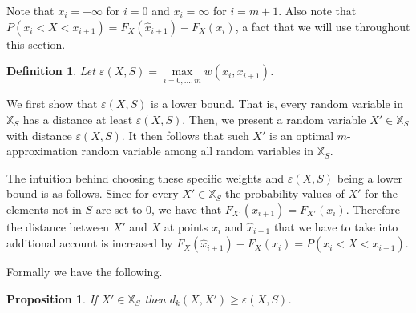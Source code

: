 \documentclass{article}
\newtheorem{definition}[thm]{Definition}
\newtheorem{proposition}[thm]{Proposition}
\begin{document}
Note that $x_i = -\infty$ for $i=0$ and $x_i=\infty$ for $i=m+1$. Also note that $P(x_i < X < x_{i+1}) = F_X(\hat x_{i+1}) - F_X(x_i)$, a fact that we will use throughout this section.

\begin{definition}
Let $\varepsilon(X,S) = \max\limits_{i=0,\dots,m} w(x_{i}, x_{i+1})$.
\end{definition}



We first show that $\varepsilon(X,S)$ is a lower bound. That is, every random variable in $\mathbb{X}_S$ has a distance at least $\varepsilon(X,S)$. Then, we present a random variable $X'\in \mathbb{X}_S$ with distance $\varepsilon(X,S)$. It then follows that such $X'$ is an optimal $m$-approximation random variable among all random variables in $\mathbb{X}_S$.

The intuition behind choosing these specific weights and $\varepsilon(X,S)$ being a lower bound is as follows.  Since for every $X'\in\mathbb{X}_S$ the probability values of $X'$ for the elements not in $S$ are set to $0$, we have that $F_{X'}(\hat x_{i+1})=F_{X'}(x_i)$. Therefore the distance between $X'$ and $X$ at points $x_i$ and $\hat x_{i+1}$ that we have to take into additional account is increased by $F_X(\hat x_{i+1})-F_X(x_i) = P(x_i < X < x_{i+1})$.

Formally we have the following.

\begin{proposition}\label{prop:minimal}
	If $X'\in\mathbb{X}_S$ then $d_k(X,X') \geq \varepsilon(X,S)$.
\end{proposition}
\end{document}
